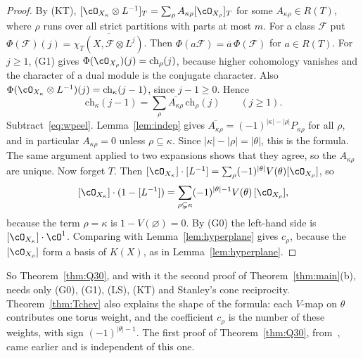 \begin{proof}
By (KT), $[\cO_{X_\kappa}\otimes L^{-1}]_T=\sum_\rho A_{\kappa\rho}[\cO_{X_\rho}]_T$ for some
$A_{\kappa\rho}\in R(T)$, where $\rho$ runs over all strict partitions with parts at most $m$. For a class
$\mathcal F$ put $\Phi(\mathcal F)(j)=\overline{\chi_T(X,\mathcal F\otimes L^j)}$. Then
$\Phi(a\mathcal F)=\overline a\,\Phi(\mathcal F)$ for $a\in R(T)$. For $j\ge1$, (G1) gives
$\Phi(\cO_{X_\rho})(j)=\mathrm{ch}_\rho(j)$, because higher cohomology vanishes and the character of a dual
module is the conjugate character. Also $\Phi(\cO_{X_\kappa}\otimes L^{-1})(j)=\mathrm{ch}_\kappa(j-1)$,
since $j-1\ge0$. Hence
\[ \mathrm{ch}_\kappa(j-1)=\sum_\rho\overline{A_{\kappa\rho}}\,\mathrm{ch}_\rho(j)\qquad(j\ge1). \]
Subtract~\eqref{eq:wpeel}. Lemma~\ref{lem:indep} gives
$\overline{A_{\kappa\rho}}=(-1)^{|\kappa|-|\rho|}P_{\kappa\rho}$ for all $\rho$, and in particular
$A_{\kappa\rho}=0$ unless $\rho\subseteq\kappa$. Since $|\kappa|-|\rho|=|\theta|$, this is the formula.
The same argument applied to two expansions shows that they agree, so the $A_{\kappa\rho}$ are unique.
Now forget $T$. Then $[\cO_{X_\kappa}]\cdot[L^{-1}]=\sum_\rho(-1)^{|\theta|}V(\theta)[\cO_{X_\rho}]$, so
\[ [\cO_{X_\kappa}]\cdot(1-[L^{-1}])=\sum_{\rho\subsetneq\kappa}(-1)^{|\theta|-1}V(\theta)\,[\cO_{X_\rho}], \]
because the term $\rho=\kappa$ is $1-V(\varnothing)=0$. By (G0) the left-hand side is
$[\cO_{X_\kappa}]\cdot\cO^1$. Comparing with Lemma~\ref{lem:hyperplane} gives $c_\rho$, because the
$[\cO_{X_\rho}]$ form a basis of $K(X)$, as in Lemma~\ref{lem:hyperplane}.
\end{proof}

So Theorem~\ref{thm:Q30}, and with it the second proof of Theorem~\ref{thm:main}(b), needs only
(G0), (G1), (LS), (KT) and Stanley's cone reciprocity. Theorem~\ref{thm:Tchev} also explains the
shape of the formula: each $V$-map on $\theta$ contributes one torus weight, and the coefficient
$c_\rho$ is the number of these weights, with sign $(-1)^{|\theta|-1}$. The first proof of
Theorem~\ref{thm:Q30}, from~\cite{BR12}, came earlier and is independent of this one.

